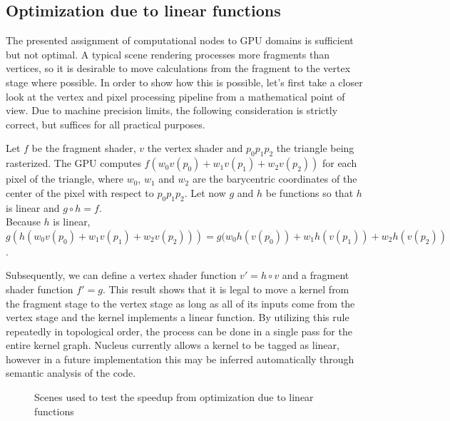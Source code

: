 \subsection{Optimization due to linear functions}

The presented assignment of computational nodes to GPU domains is sufficient but not optimal. A typical scene rendering processes more fragments than vertices, so it is desirable to move calculations from the fragment to the vertex stage where possible. In order to show how this is possible, let's first take a closer look at the vertex and pixel processing pipeline from a mathematical point of view. Due to machine precision limits, the following consideration is strictly correct, but suffices for all practical purposes.

Let $f$ be the fragment shader, $v$ the vertex shader and $p_0 p_1 p_2$ the triangle being rasterized. The GPU computes $f(w_0 v(p_0) + w_1 v(p_1) + w_2 v(p_2))$ for each pixel of the triangle, where $w_0$, $w_1$ and $w_2$ are the barycentric coordinates of the center of the pixel with respect to $p_0 p_1 p_2$. Let now $g$ and $h$ be functions so that $h$ is linear and $g \circ h = f$. \\
Because $h$ is linear, \\
$g(h(w_0 v(p_0) + w_1 v(p_1) + w_2 v(p_2))) = g(w_0 h(v(p_0)) + w_1 h(v(p_1)) + w_2 h(v(p_2))$.

Subsequently, we can define a vertex shader function $v\prime = h \circ v$ and a fragment shader function $f\prime = g$. This result shows that it is legal to move a kernel from the fragment stage to the vertex stage as long as all of its inputs come from the vertex stage and the kernel implements a linear function. By utilizing this rule repeatedly in topological order, the process can be done in a single pass for the entire kernel graph. Nucleus currently allows a kernel to be tagged as linear, however in a future implementation this may be inferred automatically through semantic analysis of the code.

\begin{figure}[h!]
  \centering
  \caption{Scenes used to test the speedup from optimization due to linear functions}
  \label{fig:linFuncOpt}
\end{figure}

